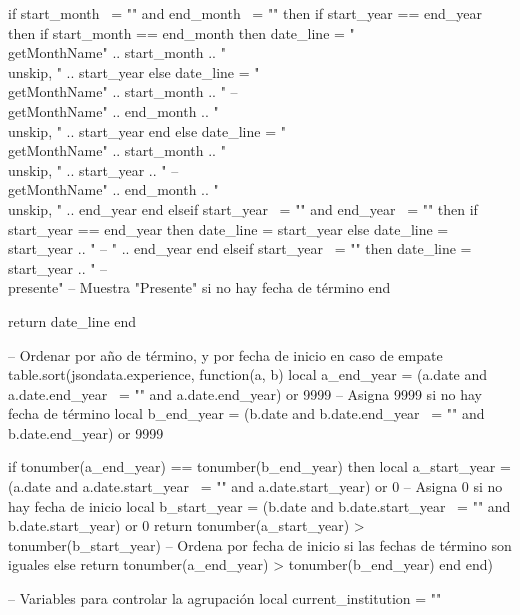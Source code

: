 \begin{luacode}
    if start_month ~= "" and end_month ~= "" then
        if start_year == end_year then
            if start_month == end_month then
                date_line = "\\getMonthName{" .. start_month .. "}\\unskip, " .. start_year
            else
                date_line = "\\getMonthName{" .. start_month .. "} -- \\getMonthName{" .. end_month .. "}\\unskip, " .. start_year
            end
        else
            date_line = "\\getMonthName{" .. start_month .. "}\\unskip, " .. start_year .. " -- \\getMonthName{" .. end_month .. "}\\unskip, " .. end_year
        end
    elseif start_year ~= "" and end_year ~= "" then
        if start_year == end_year then
            date_line = start_year
        else
            date_line = start_year .. " -- " .. end_year
        end
    elseif start_year ~= "" then
        date_line = start_year .. " -- \\presente" -- Muestra "Presente" si no hay fecha de término
    end

    return date_line
end

-- Ordenar por año de término, y por fecha de inicio en caso de empate
table.sort(jsondata.experience, function(a, b)
    local a_end_year = (a.date and a.date.end_year ~= "" and a.date.end_year) or 9999 -- Asigna 9999 si no hay fecha de término
    local b_end_year = (b.date and b.date.end_year ~= "" and b.date.end_year) or 9999

    if tonumber(a_end_year) == tonumber(b_end_year) then
        local a_start_year = (a.date and a.date.start_year ~= "" and a.date.start_year) or 0 -- Asigna 0 si no hay fecha de inicio
        local b_start_year = (b.date and b.date.start_year ~= "" and b.date.start_year) or 0
        return tonumber(a_start_year) > tonumber(b_start_year) -- Ordena por fecha de inicio si las fechas de término son iguales
    else
        return tonumber(a_end_year) > tonumber(b_end_year)
    end
end)

-- Variables para controlar la agrupación
local current_institution = ""


\end{luacode}
